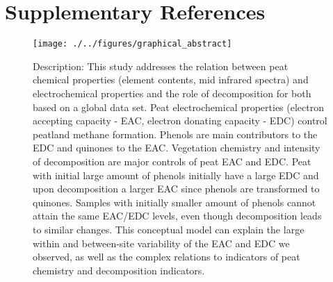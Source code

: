 \documentclass[alpha-refs, lineno]{wiley-article-rmd}
\begin{document}
\hypertarget{supplementary-references}{%
\section*{Supplementary References}\label{supplementary-references}}

\clearpage

\begin{figure}[H]

{\centering \texttt{[image: ./../figures/graphical\_abstract]}

}

\caption{Description: This study addresses the relation between peat chemical properties (element contents, mid infrared spectra) and electrochemical properties and the role of decomposition for both based on a global data set. Peat electrochemical properties (electron accepting capacity - EAC, electron donating capacity - EDC) control peatland methane formation. Phenols are main contributors to the EDC and quinones to the EAC. Vegetation chemistry and intensity of decomposition are major controls of peat EAC and EDC. Peat with initial large amount of phenols initially have a large EDC and upon decomposition a larger EAC since phenols are transformed to quinones. Samples with initially smaller amount of phenols cannot attain the same EAC/EDC levels, even though decomposition leads to similar changes. This conceptual model can explain the large within and between-site variability of the EAC and EDC we observed, as well as the complex relations to indicators of peat chemistry and decomposition indicators.}\label{fig:graphical-abstract}
\end{figure}

\end{document}
